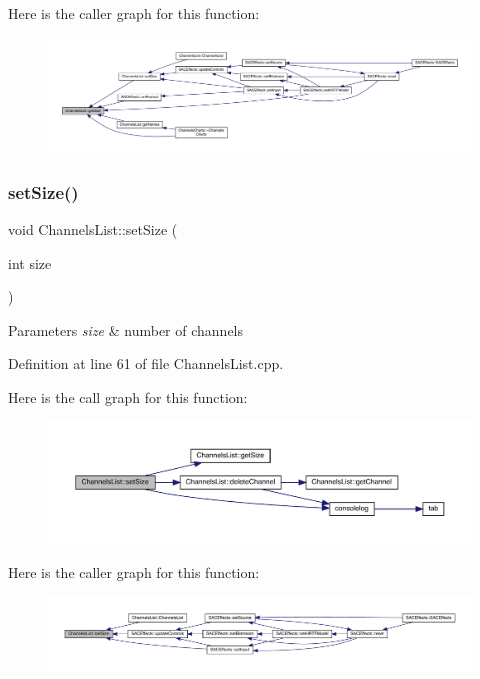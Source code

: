 Here is the caller graph for this function\+:
\nopagebreak
\begin{figure}[H]
\begin{center}
\leavevmode
\includegraphics[width=350pt]{class_channels_list_aeaeb08c6bf8aa1a48b5cc52c56505408_icgraph}
\end{center}
\end{figure}
\mbox{\label{class_channels_list_ac059e3c89763f50705ce1e2633ee3d3d}} 
\subsubsection{\texorpdfstring{set\+Size()}{setSize()}}
{\footnotesize\ttfamily void Channels\+List\+::set\+Size (\begin{DoxyParamCaption}\item[{int}]{size }\end{DoxyParamCaption})}


\begin{DoxyParams}{Parameters}
{\em size} & number of channels \\
\hline
\end{DoxyParams}


Definition at line 61 of file Channels\+List.\+cpp.

Here is the call graph for this function\+:
\nopagebreak
\begin{figure}[H]
\begin{center}
\leavevmode
\includegraphics[width=350pt]{class_channels_list_ac059e3c89763f50705ce1e2633ee3d3d_cgraph}
\end{center}
\end{figure}
Here is the caller graph for this function\+:
\nopagebreak
\begin{figure}[H]
\begin{center}
\leavevmode
\includegraphics[width=350pt]{class_channels_list_ac059e3c89763f50705ce1e2633ee3d3d_icgraph}
\end{center}
\end{figure}


